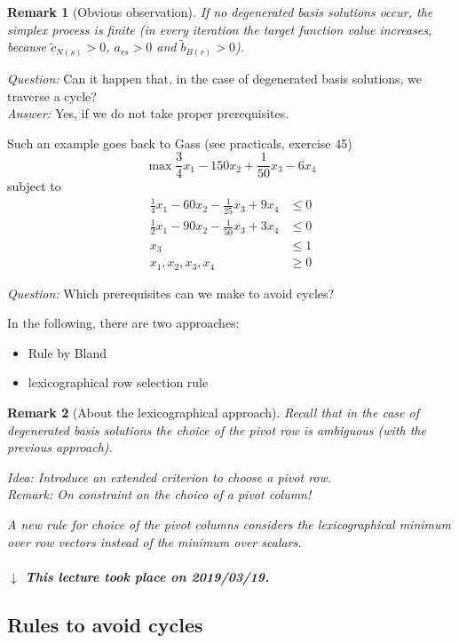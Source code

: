 \documentclass{article}
\numberwithin{lecref}{section}
\newtheorem*{Remark}{Remark}
\newcommand{\dateref}[1]{%
  \begin{mdframed}[backgroundcolor=gray!10,innerbottommargin=0pt,innertopmargin=0pt]
    \paragraph{\textit{$\downarrow$ This lecture took place on #1.}}%
  \end{mdframed}%
}
\begin{document}
\begin{Remark}[Obvious observation]
	If no degenerated basis solutions occur,
	the simplex process is finite (in every iteration the target function value increases, because $\tilde c_{N(s)} > 0$, $a_{rs} > 0$ and $\tilde b_{B(r)} > 0$).
\end{Remark}

\emph{Question:} Can it happen that, in the case of degenerated basis solutions, we traverse a cycle? \\
\emph{Answer:} Yes, if we do not take proper prerequisites.

Such an example goes back to Gass (see practicals, exercise 45)
\[ \max \frac34 x_1 - 150 x_2 + \frac1{50} x_3 - 6x_4 \]
subject to
\begin{align*}
	\frac14 x_1 - 60 x_2 - \frac1{25} x_3 + 9 x_4 &\leq 0 \\
	\frac12 x_1 - 90 x_2 - \frac1{50} x_3 + 3 x_4 &\leq 0 \\
	x_3 &\leq 1 \\
	x_1, x_2, x_3, x_4 &\geq 0
\end{align*}

\emph{Question:} Which prerequisites can we make to avoid cycles?

In the following, there are two approaches:
\begin{itemize}
	\item Rule by Bland
	\item lexicographical row selection rule
\end{itemize}

\begin{Remark}[About the lexicographical approach]
	Recall that in the case of degenerated basis solutions the choice of the pivot row is ambiguous (with the previous approach).

	\emph{Idea:} Introduce an extended criterion to choose a pivot row. \\
	\emph{Remark:} On constraint on the choico of a pivot column!

	A new rule for choice of the pivot columns considers the lexicographical minimum over row vectors instead of the minimum over scalars.
\end{Remark}

\dateref{2019/03/19}

\subsection{Rules to avoid cycles}
\end{document}
